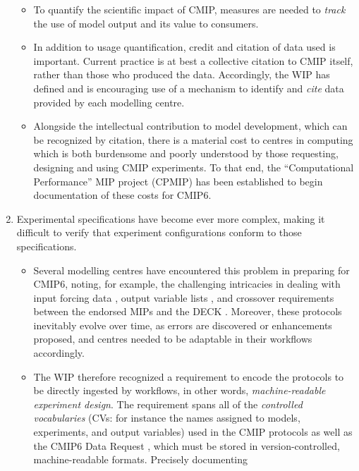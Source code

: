 \documentclass[gmd,manuscript]{copernicus}
\newcommand{\pipref}[1] {\citep{ref:#1}}
\begin{document}
\begin{enumerate}
  \begin{itemize}
  \item To quantify the scientific impact of CMIP, measures are needed
    to \emph{track} the use of model output and its value to consumers.
  \item In addition to usage quantification, credit and citation of 
    data used is important. Current practice is at best a collective 
    citation to CMIP itself, rather than those who produced the data. 
    Accordingly, the WIP has defined and is encouraging use of a 
    mechanism to identify and \emph{cite} data provided by each 
    modelling centre.
  \item Alongside the intellectual contribution to model development,
    which can be recognized by citation, there is a material cost to
    centres in computing which is both burdensome and poorly
    understood by those requesting, designing and using CMIP
    experiments. To that end, the ``Computational Performance'' MIP
    project (CPMIP) \pipref{balajietal2017} has been established to 
    begin documentation of these costs for CMIP6.
  \end{itemize}
\item\label{cmplx} Experimental specifications have become ever more
  complex, making it difficult to verify that experiment
  configurations conform to those specifications.
 \begin{itemize} 
 \item Several modelling centres have encountered this problem in
   preparing for CMIP6, noting, for example, the challenging
   intricacies in dealing with input forcing data
   \citep[see][]{ref:duracketal2017}, output variable lists
   \pipref{juckesetal2015}, and crossover requirements between the
   endorsed MIPs and the DECK \pipref{eyringetal2016a} . Moreover,
   these protocols inevitably evolve over time, as errors are
   discovered or enhancements proposed, and centres needed to be 
   adaptable in their workflows accordingly.
 \item The WIP therefore recognized a requirement to encode the
   protocols to be directly ingested by workflows, in other words,
   \emph{machine-readable experiment design}. The requirement spans
   all of the \emph{controlled vocabularies} (CVs: for instance the
   names assigned to models, experiments, and output variables) used
   in the CMIP protocols as well as the CMIP6 Data Request
   \pipref{juckesetal2015}, which must be stored in
   version-controlled, machine-readable formats. Precisely documenting

\end{itemize}
\end{enumerate}
\end{document}
